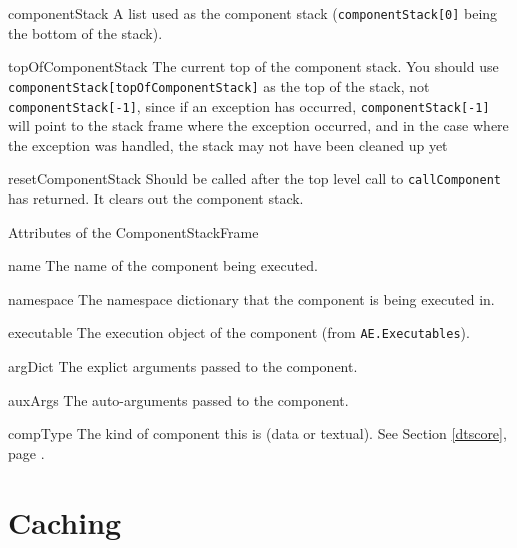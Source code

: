 \begin{datadesc}{componentStack} A list used as the component stack
(\verb!componentStack[0]! being the bottom of the stack).
\end{datadesc}
\begin{datadesc}{topOfComponentStack} The current top of the component
stack.  You should use \verb!componentStack[topOfComponentStack]! as
the top of the stack, not \verb!componentStack[-1]!, since if an
exception has occurred, \verb!componentStack[-1]! will point to the
stack frame where the exception occurred, and in the case where the
exception was handled, the stack may not have been cleaned up yet
\end{datadesc}
\begin{funcdesc}{resetComponentStack}{} Should be called after the top
level call to \texttt{callComponent} has returned.  It clears out the
component stack.
\end{funcdesc}


Attributes of the ComponentStackFrame
\begin{memberdesc}[string]{name} The name of the component being
executed.
\end{memberdesc}
\begin{memberdesc}[dictionary]{namespace} The namespace dictionary that
the component is being executed in.
\end{memberdesc}
\begin{memberdesc}[Executable]{executable} The execution object of the
component (from \verb!AE.Executables!).
\end{memberdesc}
\begin{memberdesc}[dictionary]{argDict}  The explict arguments passed to
the component.
\end{memberdesc}
\begin{memberdesc}[dictionary]{auxArgs} The auto-arguments passed to the
component.
\end{memberdesc}
\begin{memberdesc}[]{compType} The kind of component this is (data or
textual).  See Section \ref{dtscore}, page \pageref{dtscore}.
\end{memberdesc}

\section{Caching}

